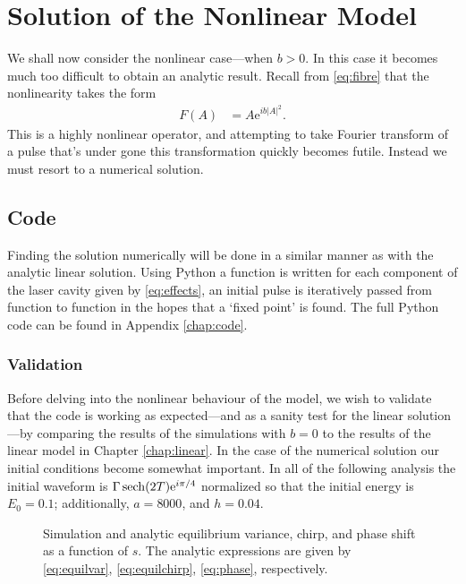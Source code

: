 
\chapter{Solution of the Nonlinear Model}
\label{chap:nl}
We shall now consider the nonlinear case---when $b > 0$. In this case it becomes much too difficult to obtain an analytic result. Recall from \eqref{eq:fibre} that the nonlinearity takes the form
\begin{align*}
F(A) &= A \textrm{e}^{i b |A|^2}.
\end{align*}
This is a highly nonlinear operator, and attempting to take Fourier transform of a pulse that's under gone this transformation quickly becomes futile. Instead we must resort to a numerical solution. \\

\section{Code}
Finding the solution numerically will be done in a similar manner as with the analytic linear solution. Using Python a function is written for each component of the laser cavity given by \eqref{eq:effects}, an initial pulse is iteratively passed from function to function in the hopes that a `fixed point' is found. The full Python code can be found in Appendix \ref{chap:code}. \\

\subsection{Validation}
Before delving into the nonlinear behaviour of the model, we wish to validate that the code is working as expected---and as a sanity test for the linear solution---by comparing the results of the simulations with $b=0$ to the results of the linear model in Chapter \ref{chap:linear}. In the case of the numerical solution our initial conditions become somewhat important. In all of the following analysis the initial waveform is $\Gamma \sech \left( 2T \right) \textrm{e}^{i \pi / 4}$ normalized so that the initial energy is $E_0 = 0.1$; additionally, $a = 8000$, and $h = 0.04$. \\
\begin{figure}[tbp]
\centering

\caption{Simulation and analytic equilibrium variance, chirp, and phase shift as a function of $s$. The analytic expressions are given by \eqref{eq:equilvar}, \eqref{eq:equilchirp}, \eqref{eq:phase}, respectively.}
\label{fig:var}
\end{figure}

